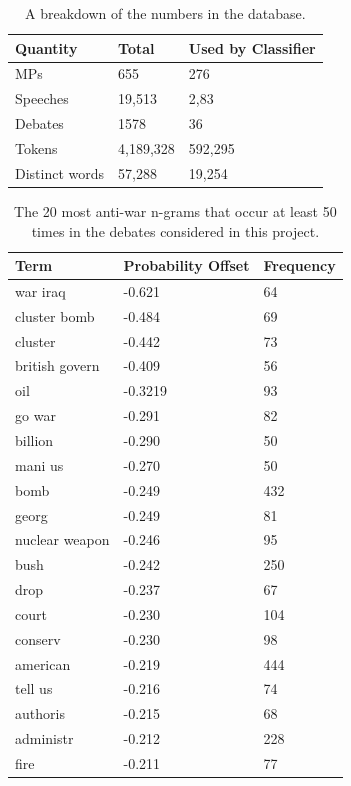 \documentclass[12pt,a4paper,twoside,openright]{report}
\begin{document}
\begin{table}[]
	\centering
	\begin{tabular}{lll}
		\hline
		\textbf{Quantity} & \textbf{Total} & \textbf{Used by Classifier} \\ \hline
		MPs               & 655            & 276                         \\
		Speeches          & 19,513         & 2,83                        \\
		Debates           & 1578           & 36                          \\ 
		Tokens            & 4,189,328      & 592,295                     \\
		Distinct words    & 57,288         & 19,254                      \\ \hline
	\end{tabular}
	\caption{A breakdown of the numbers in the database.}
	\label{table:databasestats}	
\end{table}
\begin{table}[]
	\centering
	\begin{tabular}{lll}
		\hline
		\textbf{Term}  & \textbf{Probability Offset} & \textbf{Frequency} \\ \hline
		war iraq&-0.621&64\\
		cluster bomb&-0.484&69\\
		cluster&-0.442&73\\
		british govern&-0.409&56\\
		oil&-0.3219&93\\
		go war&-0.291&82\\
		billion&-0.290&50\\
		mani us&-0.270&50\\
		bomb&-0.249&432\\
		georg&-0.249&81\\
		nuclear weapon&-0.246&95\\
		bush&-0.242&250\\
		drop&-0.237&67\\
		court&-0.230&104\\
		conserv&-0.230&98\\
		american&-0.219&444\\
		tell us&-0.216&74\\
		authoris&-0.215&68\\
		administr&-0.212&228\\
		fire&-0.211&77\\ \hline
	\end{tabular}
	\caption{The 20 most anti-war n-grams that occur at least 50 times in the debates considered in this project.}
	\label{table:anti-grams}
\end{table}
\end{document}
